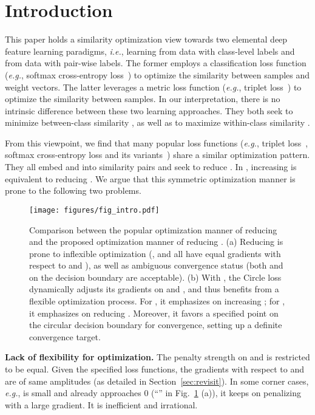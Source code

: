\documentclass[10pt,twocolumn,letterpaper]{article}
\begin{document}
\section{Introduction}\label{sec:intro}
This paper holds a similarity optimization view towards two elemental deep feature learning paradigms, \emph{i.e.}, learning from data with class-level labels and from data with pair-wise labels. The former employs a classification loss function (\emph{e.g.}, softmax cross-entropy loss~\cite{sun2014deep,Liu2016LargeMarginSL,wen2016discriminative}) to optimize the similarity between samples and weight vectors. The latter leverages a metric loss function (\emph{e.g.}, triplet loss~\cite{hoffer2015deep,schroff2015facenet}) to optimize the similarity between samples. 
In our interpretation, there is no intrinsic difference between these two learning approaches. They both seek to minimize between-class similarity , as well as to maximize within-class similarity .

From this viewpoint, we find that many popular loss functions (\emph{e.g.}, triplet loss~\cite{hoffer2015deep,schroff2015facenet}, softmax cross-entropy loss and its variants~\cite{sun2014deep,Liu2016LargeMarginSL,wen2016discriminative,wang2018additive,Wang_2018_CVPR,deng2019arcface}) share a similar optimization pattern. They all embed  and  into similarity pairs and seek to reduce . In , increasing  is equivalent to reducing . We argue that this symmetric optimization manner is prone to the following two problems.

\begin{figure}[t!]
	\centering
	\texttt{[image: figures/fig\_intro.pdf]}
	\caption{Comparison between the popular optimization manner of reducing  and the proposed optimization manner of reducing . (a) Reducing  is prone to inflexible optimization (,  and  all have equal gradients with respect to  and ), as well as ambiguous convergence status (both  and  on the decision boundary are acceptable). (b) With , the Circle loss dynamically adjusts its gradients on  and , and thus benefits from a flexible optimization process. For , it emphasizes on increasing ; for , it emphasizes on reducing . Moreover, it favors a specified point  on the circular decision boundary for convergence, setting up a definite convergence target.}
	\vspace{-4mm}
	\label{fig:intro}
\end{figure}


 \textbf{Lack of flexibility for optimization.}  The penalty strength on  and  is restricted to be equal. Given the specified loss functions, the gradients with respect to  and  are of same amplitudes (as detailed in Section~\ref{sec:revisit}). In some corner cases, \emph{e.g.},  is small and  already approaches 0 (``'' in Fig.~\ref{fig:intro} (a)), it keeps on penalizing  with a large gradient. It is inefficient and irrational. 
\end{document}
